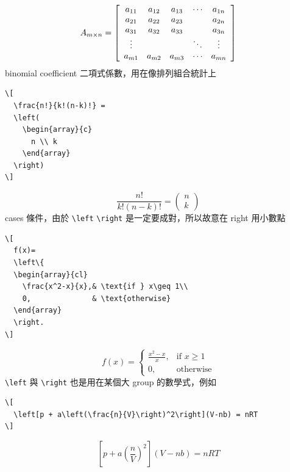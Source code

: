 \begin{equation*}
  A_{m \times n} =
  \left [
    \begin{array}{*5c}
      a_{11} & a_{12} & a_{13} & \cdots & a_{1n} \\
      a_{21} & a_{22} & a_{23} && a_{2n} \\
      a_{31} & a_{32} & a_{33} && a_{3n} \\
      \vdots & 
      &
      & \ddots & \vdots \\
      a_{m1} & a_{m2} & a_{m3} & \cdots & a_{mn}
    \end{array}
  \right]
\end{equation*}
binomial coefficient 二項式係數，用在像排列組合統計上
\begin{verbatim}
\[
  \frac{n!}{k!(n-k)!} = 
  \left(
    \begin{array}{c}
      n \\ k
    \end{array}
  \right)
\]
\end{verbatim}
\[
  \frac{n!}{k!(n-k)!} = 
  \left(
    \begin{array}{c}
      n \\ k
    \end{array}
  \right)
\]
cases 條件，由於 \verb=\left= \verb=\right= 是一定要成對，所以故意在 right
用小數點
\begin{verbatim}
\[
  f(x)=
  \left\{
  \begin{array}{cl}
    \frac{x^2-x}{x},& \text{if } x\geq 1\\
    0,              & \text{otherwise}
  \end{array}
  \right.
\]
\end{verbatim}
\[
  f(x)=
  \left\{
  \begin{array}{cl}
    \frac{x^2-x}{x},& \text{if } x\geq 1\\
    0,              & \text{otherwise}
  \end{array}
  \right.
\]
\verb=\left= 與 \verb=\right= 也是用在某個大 group 的數學式，例如
\begin{verbatim}
\[
  \left[p + a\left(\frac{n}{V}\right)^2\right](V-nb) = nRT
\]
\end{verbatim}
\[
  \left[p + a\left(\frac{n}{V}\right)^2\right](V-nb) = nRT
\]

